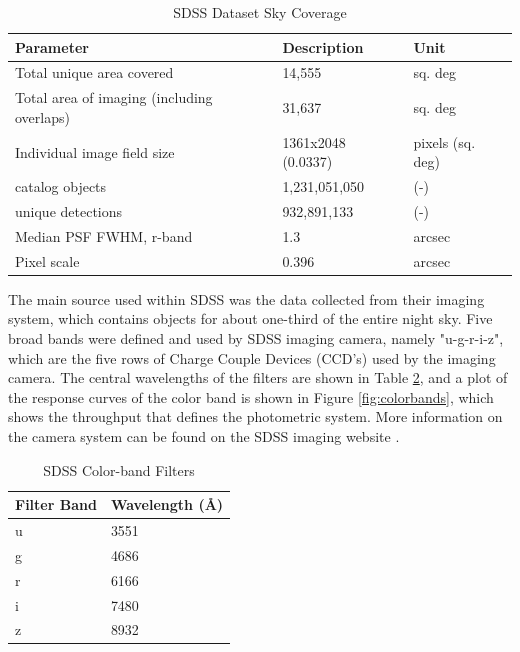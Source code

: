 \documentclass[11pt,sigconf]{acmart}
\begin{document}
\begin{table}[]
  \begin{tabular}{ |p{4.0cm}|p{2.0cm}|p{1.3cm}|  } \hline
   \textbf{Parameter} & \textbf{Description} & \textbf{Unit}  \\ \hline
   Total unique area covered & 14,555  & sq. deg \\ \hline
   Total area of imaging (including overlaps) & 31,637 & sq. deg \\ \hline
   Individual image field size & 1361x2048 (0.0337) & pixels (sq. deg) \\ \hline
   catalog objects & 1,231,051,050 & (-) \\ \hline
   unique detections & 932,891,133 & (-) \\ \hline
   Median PSF FWHM, r-band & 1.3 & arcsec \\ \hline
   Pixel scale & 0.396 & arcsec \\ \hline
  \end{tabular}
  \caption{\label{tab:table_SDSS}SDSS Dataset Sky Coverage \cite{abdurro}}
\end{table}

The main source used within SDSS was the data collected from their imaging system, 
which contains objects for about one-third of the entire night sky. Five broad 
bands were defined and used by SDSS imaging camera, namely "u-g-r-i-z", which 
are the five rows of Charge Couple Devices (CCD's) used by the imaging camera. 
The central wavelengths of the filters are shown in Table \ref{tab:table_filters}, 
and a plot of the response curves of the color band is shown in 
Figure \ref{fig:colorbands}, which shows the throughput that defines the photometric 
system. More information on the camera system can be found on the SDSS 
imaging website \cite{sdss_imaging}. 

\begin{table}[]
  \begin{tabular}{ |p{2.2cm}|p{2.6cm}|  } \hline
   \textbf{Filter Band} & \textbf{Wavelength (\AA)} \\ \hline
   u & 3551 \\ \hline
   g & 4686 \\ \hline
   r & 6166 \\ \hline
   i & 7480 \\ \hline
   z & 8932 \\ \hline
  \end{tabular}
  \caption{\label{tab:table_filters}SDSS Color-band Filters \cite{sdss_imaging}}
\end{table}
\end{document}
